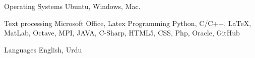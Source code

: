 

\begin{cvskills}
\cvskill
{Operating Systems} %
{Ubuntu, Windows, Mac.} %

\cvskill
{Text processing} %
{Microsoft Office, Latex}
  \cvskill
    {Programming} %
    {Python, C/C++, LaTeX, MatLab, Octave, MPI, JAVA, C-Sharp, HTML5, CSS, Php,   Oracle, GitHub} %


  \cvskill
    {Languages} %
    {English, Urdu} %

\end{cvskills}

